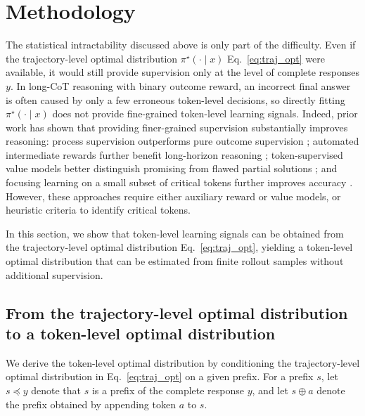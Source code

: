 \documentclass{article}
\begin{document}
\section{Methodology}

The statistical intractability discussed above is only part of the difficulty. Even if the trajectory-level optimal distribution $\pi^\star(\cdot \mid x)$ Eq.~\eqref{eq:traj_opt} were available, it would still provide supervision only at the level of complete responses $y$. 
In long-CoT reasoning with binary outcome reward, an incorrect final answer 
is often caused by only a few erroneous token-level decisions, so directly 
fitting $\pi^\star(\cdot \mid x)$ does not provide fine-grained token-level 
learning signals. 
Indeed, prior work has shown that providing finer-grained supervision 
substantially improves reasoning: process supervision outperforms pure 
outcome supervision \citep{lightman2023letsverify}; automated intermediate 
rewards further benefit long-horizon reasoning \citep{luo2024automated}; 
token-supervised value models better distinguish promising from flawed 
partial solutions \citep{lee2025tvm}; and focusing learning on a small 
subset of critical tokens further improves accuracy \citep{lin2025critical}. 
However, these approaches require either auxiliary reward or value models, 
or heuristic criteria to identify critical tokens.

In this section, we show that token-level learning signals can be obtained 
from the trajectory-level optimal distribution Eq.~\eqref{eq:traj_opt}, yielding a 
token-level optimal distribution that can be estimated from finite rollout 
samples without additional supervision.


\subsection{From the trajectory-level optimal distribution to a token-level optimal distribution}
\label{sec:token_opt_distribution}

We derive the token-level optimal distribution by conditioning the trajectory-level optimal distribution in Eq.~\eqref{eq:traj_opt} on a given prefix. For a prefix $s$, let $s\preceq y$ denote that $s$ is a prefix of the complete response $y$, and let $s\oplus a$ denote the prefix obtained by appending token $a$ to $s$.
\end{document}

